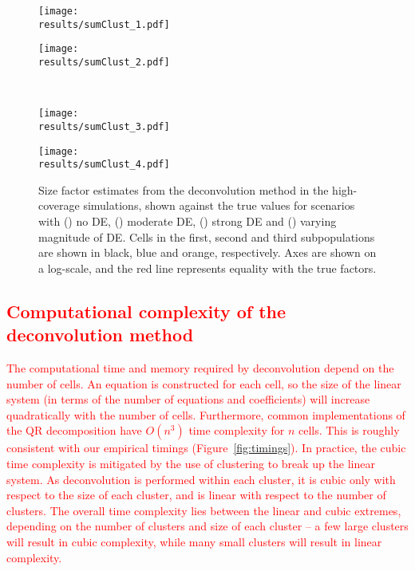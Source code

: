\documentclass{article}
\newcommand\revised[1]{\textcolor{red}{#1}}
\begin{document}
\begin{figure}[btp]
\begin{center}
\begin{minipage}{0.33\textwidth}
\texttt{[image: \\results/sumClust\_1.pdf]}
\subcaption{}\label{subfig:sumclust_1}
\end{minipage}
\begin{minipage}{0.33\textwidth}
\texttt{[image: \\results/sumClust\_2.pdf]}
\subcaption{}\label{subfig:sumclust_2}
\end{minipage}  \\ 
\begin{minipage}{0.33\textwidth}
\texttt{[image: \\results/sumClust\_3.pdf]}
\subcaption{}\label{subfig:sumclust_3}
\end{minipage}
\begin{minipage}{0.33\textwidth}
\texttt{[image: \\results/sumClust\_4.pdf]}
\subcaption{}\label{subfig:sumclust_4}
\end{minipage}
\end{center}
\caption{Size factor estimates from the deconvolution method in the high-coverage simulations,
    shown against the true values for scenarios with () no DE, () moderate DE, () strong DE and () varying magnitude of DE.
    Cells in the first, second and third subpopulations are shown in black, blue and orange, respectively.
    Axes are shown on a log-scale, and the red line represents equality with the true factors.
}
\label{fig:highcovdeconv}
\end{figure}

\revised{\section{Computational complexity of the deconvolution method}
The computational time and memory required by deconvolution depend on the number of cells.
An equation is constructed for each cell, so the size of the linear system (in terms of the number of equations and coefficients) will increase quadratically with the number of cells.
Furthermore, common implementations of the QR decomposition have $O(n^3)$ time complexity for $n$ cells.
This is roughly consistent with our empirical timings (Figure~\ref{fig:timings}).
In practice, the cubic time complexity is mitigated by the use of clustering to break up the linear system.
As deconvolution is performed within each cluster, it is cubic only with respect to the size of each cluster, and is linear with respect to the number of clusters.
The overall time complexity lies between the linear and cubic extremes, depending on the number of clusters and size of each cluster 
    -- a few large clusters will result in cubic complexity, while many small clusters will result in linear complexity.}
\end{document}
